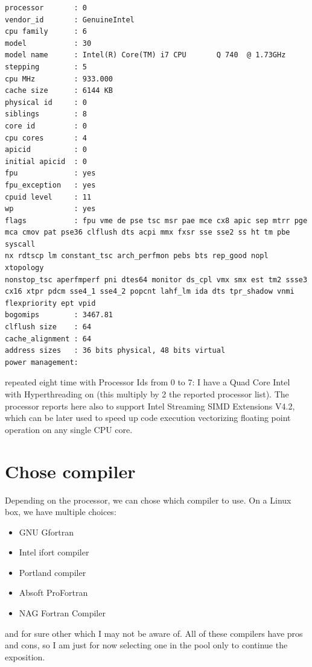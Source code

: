 \begin{Verbatim}
processor       : 0
vendor_id       : GenuineIntel
cpu family      : 6
model           : 30
model name      : Intel(R) Core(TM) i7 CPU       Q 740  @ 1.73GHz
stepping        : 5
cpu MHz         : 933.000
cache size      : 6144 KB
physical id     : 0
siblings        : 8
core id         : 0
cpu cores       : 4
apicid          : 0
initial apicid  : 0
fpu             : yes
fpu_exception   : yes
cpuid level     : 11
wp              : yes
flags           : fpu vme de pse tsc msr pae mce cx8 apic sep mtrr pge
mca cmov pat pse36 clflush dts acpi mmx fxsr sse sse2 ss ht tm pbe syscall
nx rdtscp lm constant_tsc arch_perfmon pebs bts rep_good nopl xtopology
nonstop_tsc aperfmperf pni dtes64 monitor ds_cpl vmx smx est tm2 ssse3
cx16 xtpr pdcm sse4_1 sse4_2 popcnt lahf_lm ida dts tpr_shadow vnmi
flexpriority ept vpid
bogomips        : 3467.81                                                       
clflush size    : 64                                                            
cache_alignment : 64                                                            
address sizes   : 36 bits physical, 48 bits virtual                             
power management:
\end{Verbatim}

repeated eight time with Processor Ids from 0 to 7: I have a Quad Core Intel
with Hyperthreading on (this multiply by 2 the reported processor list).
The processor reports here also to support Intel Streaming SIMD Extensions V4.2,
which can be later used to speed up code execution vectorizing floating point
operation on any single CPU core.

\section{Chose compiler}

Depending on the processor, we can chose which compiler to use. On a Linux box,
we have multiple choices:

\begin{itemize}
\item GNU Gfortran
\item Intel ifort compiler
\item Portland compiler
\item Absoft ProFortran
\item NAG Fortran Compiler
\end{itemize}

and for sure other which I may not be aware of. All of these compilers have pros
and cons, so I am just for now selecting one in the pool only to continue the
exposition.

